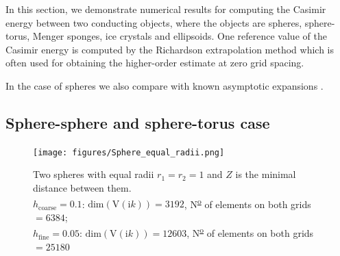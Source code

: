 

In this section, we demonstrate numerical results for computing the Casimir energy between two conducting objects, where the objects are spheres, sphere-torus, Menger sponges,
ice crystals and ellipsoids. One reference value of the Casimir energy is
computed by the Richardson extrapolation method which is often used for obtaining the
higher-order estimate at zero grid spacing.



In the case of spheres we also compare with known asymptotic expansions \cite{emig2008casimir}.

\subsection{Sphere-sphere and sphere-torus case}
\begin{figure}[H]
    \hspace*{3cm}\texttt{[image: figures/Sphere\_equal\_radii.png]}
    \caption{Two spheres with equal radii $r_{1} = r_{2} = 1$ and $Z$ is the minimal distance between them.
    \\ \hspace*{1.2cm} $h_{\text{coarse}} = 0.1$: $\text{dim}(\mathrm{V}(\mathrm{i}k)) = 3192$,  N\textsuperscript{\underline{o}} of elements on both grids $ = 6384$;\\
    \hspace*{1.2cm}$h_{\text{fine}} = 0.05$: $\text{dim}(\mathrm{V}(\mathrm{i}k)) = 12603$,  N\textsuperscript{\underline{o}} of elements on both grids $ = 25180$}
    \label{Two spheres with equal radii}
\end{figure}


